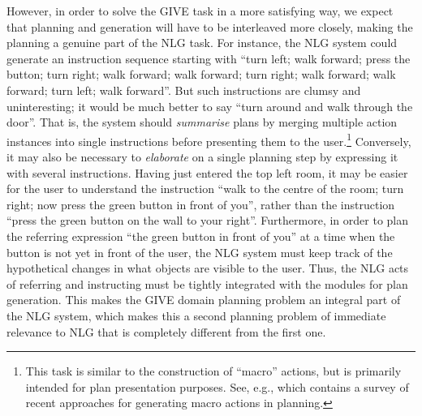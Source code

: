 \documentclass[letterpaper]{article}
\begin{document}
However, in order to solve the GIVE task in a more satisfying way, we
expect that planning and generation will have to be interleaved more
closely, making the planning a genuine part of the NLG task. For
instance, the NLG system could generate an instruction sequence
starting with ``turn left; walk forward; press the button; turn right;
walk forward; walk forward; turn right; walk forward; walk forward;
turn left; walk forward''. But such instructions are clumsy and
uninteresting; it would be much better to say ``turn around and walk
through the door''. That is, the system should \emph{summarise} plans
by merging multiple action instances into single instructions before
presenting them to the user.\footnote{This task is similar to the
  construction of ``macro'' actions, but is primarily intended for
  plan presentation purposes. See, e.g., \citep{Botea-etal:05} which
  contains a survey of recent approaches for generating macro actions
  in planning.}  Conversely, it may also be necessary to
\emph{elaborate} on a single planning step by expressing it with
several instructions. Having just entered the top left room, it may be
easier for the user to understand the instruction ``walk to the centre
of the room; turn right; now press the green button in front of you'',
rather than the instruction ``press the green button on the wall to
your right''. Furthermore, in order to plan the referring expression
``the green button in front of you'' at a time when the button is not
yet in front of the user, the NLG system must keep track of the
hypothetical changes in what objects are visible to the user. Thus,
the NLG acts of referring and instructing must be tightly integrated
with the modules for plan generation. This makes the GIVE domain
planning problem an integral part of the NLG system, which makes this
a second planning problem of immediate relevance to NLG that is
completely different from the first one.
\end{document}
